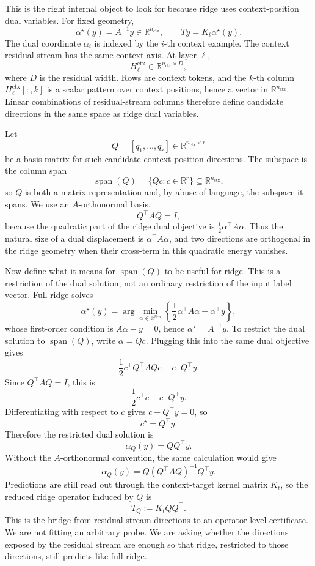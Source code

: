 \documentclass[11pt]{article}
\newcommand{\R}{\mathbb{R}}
\newcommand{\spanop}{\operatorname{span}}
\begin{document}
This is the right internal object to look for because ridge uses context-position dual variables.
For fixed geometry,
\[
\alpha^\star(y)=A^{-1}y\in\R^{n_{\mathrm{ctx}}},
\qquad
Ty=K_t\alpha^\star(y).
\]
The dual coordinate \(\alpha_i\) is indexed by the \(i\)-th context example. The context residual
stream has the same context axis. At layer \(\ell\),
\[
H_\ell^{\mathrm{ctx}}\in\R^{n_{\mathrm{ctx}}\times D},
\]
where \(D\) is the residual width. Rows are context tokens, and the \(k\)-th column
\(H_\ell^{\mathrm{ctx}}[:,k]\) is a scalar pattern over context positions, hence a vector in
\(\R^{n_{\mathrm{ctx}}}\). Linear combinations of residual-stream columns therefore define
candidate directions in the same space as ridge dual variables.

Let
\[
Q=[q_1,\ldots,q_r]\in\R^{n_{\mathrm{ctx}}\times r}
\]
be a basis matrix for such candidate context-position directions. The subspace is the column span
\[
\spanop(Q)=\{Qc:c\in\R^r\}\subseteq\R^{n_{\mathrm{ctx}}},
\]
so \(Q\) is both a matrix representation and, by abuse of language, the subspace it spans. We use
an \(A\)-orthonormal basis,
\[
Q^\top A Q=I,
\]
because the quadratic part of the ridge dual objective is \(\frac12\alpha^\top A\alpha\). Thus the
natural size of a dual displacement is \(\alpha^\top A\alpha\), and two directions are orthogonal in
the ridge geometry when their cross-term in this quadratic energy vanishes.

Now define what it means for \(\spanop(Q)\) to be useful for ridge. This is a restriction of the
dual solution, not an ordinary restriction of the input label vector. Full ridge solves
\[
\alpha^\star(y)
=
\arg\min_{\alpha\in\R^{n_{\mathrm{ctx}}}}
\left\{
\frac12\alpha^\top A\alpha-\alpha^\top y
\right\},
\]
whose first-order condition is \(A\alpha-y=0\), hence \(\alpha^\star=A^{-1}y\). To restrict the
dual solution to \(\spanop(Q)\), write \(\alpha=Qc\). Plugging this into the same dual objective gives
\[
\frac12 c^\top Q^\top A Qc-c^\top Q^\top y.
\]
Since \(Q^\top A Q=I\), this is
\[
\frac12 c^\top c-c^\top Q^\top y.
\]
Differentiating with respect to \(c\) gives \(c-Q^\top y=0\), so
\[
c^\star=Q^\top y.
\]
Therefore the restricted dual solution is
\[
\alpha_Q(y)=QQ^\top y.
\]
Without the \(A\)-orthonormal convention, the same calculation would give
\[
\alpha_Q(y)=Q(Q^\top A Q)^{-1}Q^\top y.
\]
Predictions are still read out through the context-target kernel matrix \(K_t\), so the reduced
ridge operator induced by \(Q\) is
\[
T_Q:=K_tQQ^\top.
\]
This is the bridge from residual-stream directions to an operator-level certificate. We are not
fitting an arbitrary probe. We are asking whether the directions exposed by the residual stream are
enough so that ridge, restricted to those directions, still predicts like full ridge.
\end{document}
